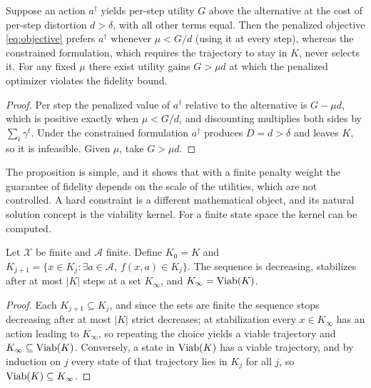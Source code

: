 \begin{proposition}\label{prop:penalty}
Suppose an action $a^\dagger$ yields per-step utility $G$ above the alternative at the cost of per-step distortion $d>\delta$, with all other terms equal. Then the penalized objective \eqref{eq:objective} prefers $a^\dagger$ whenever $\mu<G/d$ (using it at every step), whereas the constrained formulation, which requires the trajectory to stay in $K$, never selects it. For any fixed $\mu$ there exist utility gains $G>\mu d$ at which the penalized optimizer violates the fidelity bound.
\end{proposition}

\begin{proof}
Per step the penalized value of $a^\dagger$ relative to the alternative is $G-\mu d$, which is positive exactly when $\mu<G/d$, and discounting multiplies both sides by $\sum_t\gamma^t$. Under the constrained formulation $a^\dagger$ produces $D=d>\delta$ and leaves $K$, so it is infeasible. Given $\mu$, take $G>\mu d$.
\end{proof}

The proposition is simple, and it shows that with a finite penalty weight the guarantee of fidelity depends on the scale of the utilities, which are not controlled. A hard constraint is a different mathematical object, and its natural solution concept is the viability kernel. For a finite state space the kernel can be computed.

\begin{proposition}\label{prop:viabcomp}
Let $\mathcal X$ be finite and $\mathcal A$ finite. Define $K_0=K$ and $K_{j+1}=\{x\in K_j:\exists a\in\mathcal A,\ f(x,a)\in K_j\}$. The sequence is decreasing, stabilizes after at most $|K|$ steps at a set $K_\infty$, and $K_\infty=\operatorname{Viab}(K)$.
\end{proposition}

\begin{proof}
Each $K_{j+1}\subseteq K_j$, and since the sets are finite the sequence stops decreasing after at most $|K|$ strict decreases; at stabilization every $x\in K_\infty$ has an action leading to $K_\infty$, so repeating the choice yields a viable trajectory and $K_\infty\subseteq\operatorname{Viab}(K)$. Conversely, a state in $\operatorname{Viab}(K)$ has a viable trajectory, and by induction on $j$ every state of that trajectory lies in $K_j$ for all $j$, so $\operatorname{Viab}(K)\subseteq K_\infty$.
\end{proof}

